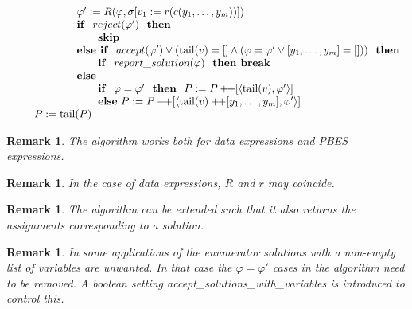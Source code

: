 \documentclass{article}
\newtheorem{remark}[theorem]{Remark}
\newcommand{\concat}{\ensuremath{+\!\!+}}
\begin{document}
\[\begin{tabular}{l}
\qquad \qquad \qquad $\varphi ^{\prime }:=R(\varphi ,\sigma \lbrack v_{1}:=r(c(y_{1},\ldots ,y_{m}))])$ \\
\qquad \qquad \qquad \textbf{if } $reject(\varphi')$ \textbf{ then} \\
\qquad \qquad \qquad \qquad \textbf{skip } \\
\qquad \qquad \qquad \textbf{else if } $accept(\varphi')
\vee (\mathrm{tail}(v) = [] \wedge (\varphi = \varphi' \vee [y_1,\ldots ,y_m] = [])) 
$ \textbf{ then} \\
\qquad \qquad \qquad \qquad \textbf{if } $report\_solution(\varphi)$ \textbf{ then break} \\
\qquad \qquad \qquad \textbf{else} \\
\qquad \qquad \qquad \qquad \textbf{if } $\varphi = \varphi'$ \textbf{ then }
$P:=P\concat\lbrack \left\langle \mathrm{tail}(v),\varphi'\right\rangle ]$ \\
\qquad \qquad \qquad \qquad \textbf{else}
$P:=P\concat\lbrack \left\langle \mathrm{tail}(v) \concat [y_{1},\ldots ,y_{m}],\varphi'\right\rangle ]$ \\
\qquad $P:=\mathrm{tail}(P)$
\end{tabular}
\]

\begin{remark}
The algorithm works both for data expressions and PBES expressions.
\end{remark}

\begin{remark}
In the case of data expressions, $R$ and $r$ may coincide.
\end{remark}

\begin{remark}
The algorithm can be extended such that it also returns the assignments
corresponding to a solution.
\end{remark}

\begin{remark}
In some applications of the enumerator solutions with a non-empty list of variables are unwanted. In that case the $\varphi = \varphi'$ cases in the algorithm need to be removed. A boolean setting accept\_solutions\_with\_variables is introduced to control this.
\end{remark}
\end{document}
